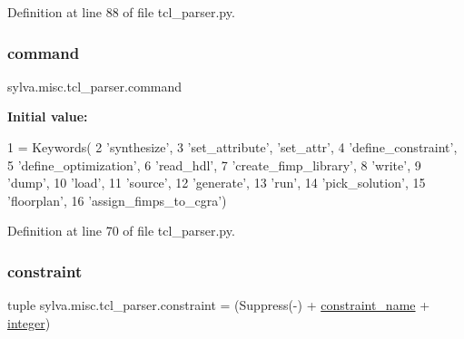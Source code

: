 Definition at line 88 of file tcl\+\_\+parser.\+py.

\mbox{\label{namespacesylva_1_1misc_1_1tcl__parser_a5c0cde73a595ea661179ea225ff2ceba}} 
\subsubsection{\texorpdfstring{command}{command}}
{\footnotesize\ttfamily sylva.\+misc.\+tcl\+\_\+parser.\+command}

{\bfseries Initial value\+:}
\begin{DoxyCode}
1 =  Keywords(
2     \textcolor{stringliteral}{'synthesize'},
3     \textcolor{stringliteral}{'set\_attribute'}, \textcolor{stringliteral}{'set\_attr'},
4     \textcolor{stringliteral}{'define\_constraint'},
5     \textcolor{stringliteral}{'define\_optimization'},
6     \textcolor{stringliteral}{'read\_hdl'},
7     \textcolor{stringliteral}{'create\_fimp\_library'},
8     \textcolor{stringliteral}{'write'},
9     \textcolor{stringliteral}{'dump'},
10     \textcolor{stringliteral}{'load'},
11     \textcolor{stringliteral}{'source'},
12     \textcolor{stringliteral}{'generate'},
13     \textcolor{stringliteral}{'run'},
14     \textcolor{stringliteral}{'pick\_solution'},
15     \textcolor{stringliteral}{'floorplan'},
16     \textcolor{stringliteral}{'assign\_fimps\_to\_cgra'})
\end{DoxyCode}


Definition at line 70 of file tcl\+\_\+parser.\+py.

\mbox{\label{namespacesylva_1_1misc_1_1tcl__parser_aca4985821c9124374a17c708bfcf6277}} 
\subsubsection{\texorpdfstring{constraint}{constraint}}
{\footnotesize\ttfamily tuple sylva.\+misc.\+tcl\+\_\+parser.\+constraint = (Suppress(\textquotesingle{}-\/\textquotesingle{}) + \hyperlink{namespacesylva_1_1misc_1_1tcl__parser_a0e59a913865b08b792584c609dd496c1}{constraint\+\_\+name} + \hyperlink{namespacesylva_1_1misc_1_1tcl__parser_aaa6da6af48cbfc02e2f6edd078ea16ab}{integer})}



